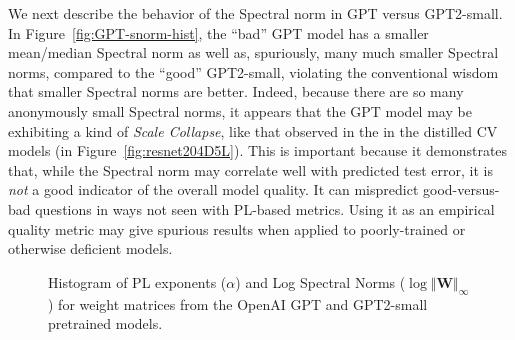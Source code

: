 We next describe the behavior of the Spectral norm in GPT versus GPT2-small.
In Figure~\ref{fig:GPT-snorm-hist}, the ``bad'' GPT model has a smaller mean/median Spectral norm as well as, spuriously, many much smaller Spectral norms, compared to the ``good'' GPT2-small, violating the conventional wisdom that smaller Spectral norms are better.
Indeed, because there are so many anonymously small Spectral norms, it appears that the GPT model may be exhibiting a kind of \emph{Scale Collapse}, like that observed in the in the distilled CV models (in Figure~\ref{fig:resnet204D5L}).
This is important because it demonstrates that, while the Spectral norm may correlate well with predicted test error, it is \emph{not} a good indicator of the overall model quality.
It can mispredict good-versus-bad questions in ways not seen with PL-based metrics.
Using it as an empirical quality metric may give spurious results when applied to poorly-trained or otherwise deficient models. 

\begin{figure}[h]
    \centering
   \caption{Histogram of PL exponents ($\alpha$) and Log Spectral Norms ($\log\Vert\mathbf{W}\Vert_{\infty}$) for weight matrices from the OpenAI GPT and GPT2-small pretrained models.}
   
\label{fig:GPT-hist}
\end{figure}


